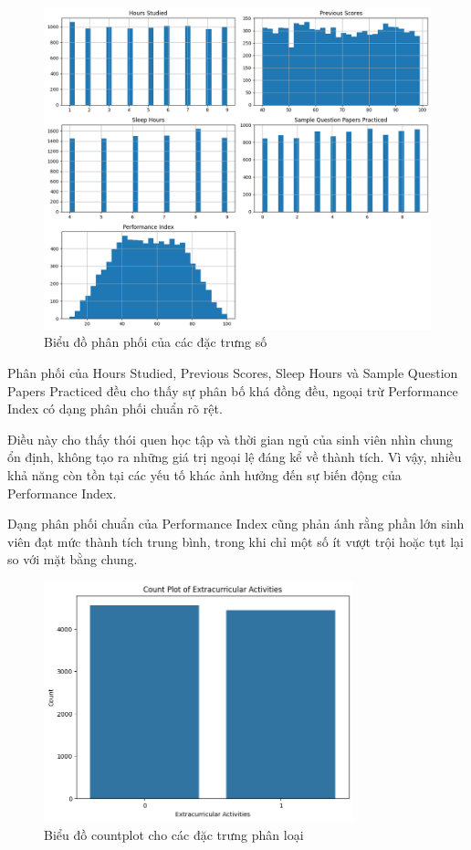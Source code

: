 \begin{figure}[H]
	\centering
	\includegraphics[width=\textwidth]{images/eda/1.png}
	\caption{Biểu đồ phân phối của các đặc trưng số}
\end{figure}

Phân phối của Hours Studied, Previous Scores, Sleep Hours và Sample Question Papers Practiced đều cho thấy sự phân bố khá đồng đều, ngoại trừ Performance Index có dạng phân phối chuẩn rõ rệt.

Điều này cho thấy thói quen học tập và thời gian ngủ của sinh viên nhìn chung ổn định, không tạo ra những giá trị ngoại lệ đáng kể về thành tích. Vì vậy, nhiều khả năng còn tồn tại các yếu tố khác ảnh hưởng đến sự biến động của Performance Index.

Dạng phân phối chuẩn của Performance Index cũng phản ánh rằng phần lớn sinh viên đạt mức thành tích trung bình, trong khi chỉ một số ít vượt trội hoặc tụt lại so với mặt bằng chung.

\begin{figure}[H]
	\centering
	\includegraphics[width=0.8\textwidth]{images/eda/2.png}
	\caption{Biểu đồ countplot cho các đặc trưng phân loại}
\end{figure}

